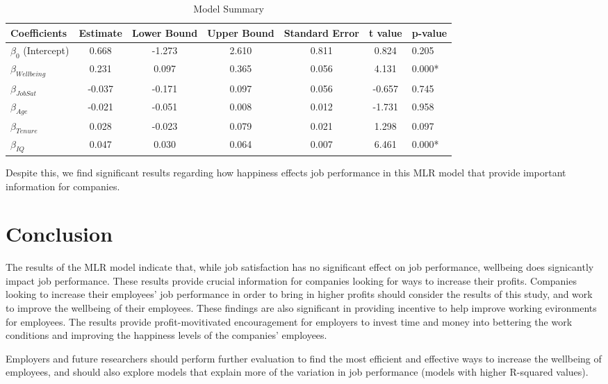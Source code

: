 \documentclass{svproc}
\begin{document}
\begin{table}[H]
\begin{center}
\caption{Model Summary}
\begin{tabular}{l | c c c c c l}
\hline
Coefficients & {Estimate   } & { Lower Bound  } & { Upper Bound  }  & { Standard Error } & {t value  } & { p-value } \\
\hline
$\beta_0$ (Intercept)  & 0.668 & -1.273 & 2.610 &  0.811 & 0.824 & { 0.205} \\
$\beta_{Wellbeing}$ & 0.231 & 0.097 & 0.365 &  0.056 &  4.131 &  { 0.000*}   \\
$\beta_{JobSat}$  & -0.037 & -0.171 & 0.097 &  0.056 &  -0.657 &  { 0.745}    \\
$\beta_{Age}$  & -0.021 & -0.051 & 0.008 & 0.012 & -1.731 & { 0.958}    \\
$\beta_{Tenure}$ & 0.028 & -0.023 & 0.079 & 0.021 & 1.298 &  { 0.097}    \\
$\beta_{IQ}$ & 0.047 & 0.030 & 0.064 &  0.007 &  6.461 &  { 0.000*}    \\
\hline
\end{tabular}
\label{coef}
\end{center}
\end{table}

Despite this, we find significant results regarding how happiness effects job performance in this MLR model that provide important information for companies.

\section{Conclusion}

The results of the MLR model indicate that, while job satisfaction has no significant effect on job performance, wellbeing does signicantly impact job performance. These results provide crucial information for companies looking for ways to increase their profits. Companies looking to increase their employees' job performance in order to bring in higher profits should consider the results of this study, and work to improve the wellbeing of their employees. These findings are also significant in providing incentive to help improve working evironments for employees. The results provide profit-movitivated encouragement for employers to invest time and money into bettering the work conditions and improving the happiness levels of the companies' employees.

Employers and future researchers should perform further evaluation to find the most efficient and effective ways to increase the wellbeing of employees, and should also explore models that explain more of the variation in job performance (models with higher R-squared values).
\end{document}

